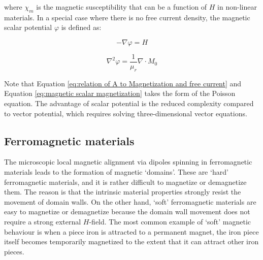         
        where $\chi_m$ is the magnetic susceptibility that can be a function of $H$ in non-linear materials. In a special case where there is no free current density, the magnetic scalar potential $\varphi$ is defined as:
        
        
        \begin{equation}
            - \nabla \varphi = H
            \label{eq:magnetic scalar and vector potential}
        \end{equation}     
        
        \begin{equation}
            \nabla^2 \varphi = \frac{1}{\mu_r} \nabla \cdot M_0
            \label{eq:magnetic scalar magnetization}
        \end{equation}     
        
        
        Note that Equation \ref{eq:relation of A to Magnetization and free current} and Equation \ref{eq:magnetic scalar magnetization} takes the form of the Poisson equation. The advantage of scalar potential is the reduced complexity compared to vector potential, which requires solving three-dimensional vector equations.
        
        
    \subsection{Ferromagnetic materials}                \label{Chapter:background/electromagnetic field theory/ferromagnetic material theory}
    
    
        The microscopic local magnetic alignment via dipoles spinning in ferromagnetic materials leads to the formation of magnetic ‘domains’. These are ‘hard’ ferromagnetic materials, and it is rather difficult to magnetize or demagnetize them. The reason is that the intrinsic material properties strongly resist the movement of domain walls. On the other hand, ‘soft’ ferromagnetic materials are easy to magnetize or demagnetize because the domain wall movement does not require a strong external $H$-field. The most common example of ‘soft’ magnetic behaviour is when a piece iron is attracted to a permanent magnet, the iron piece itself becomes temporarily magnetized to the extent that it can attract other iron pieces. 
        
